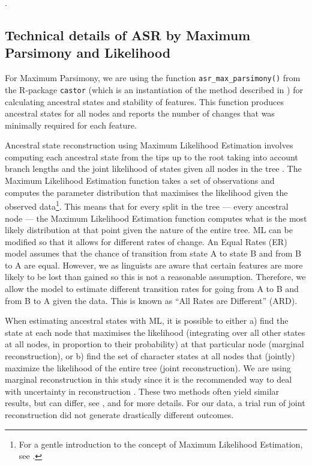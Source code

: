 \documentclass[12pt,letterpaper]{article}
\begin{document}
.

\FloatBarrier
\subsection{Technical details of ASR by Maximum Parsimony and Likelihood}
\label{supp:tech_details}

For Maximum Parsimony, we are using the function \texttt{asr\_max\_parsimony()} from the R-package \texttt{castor} \citep{louca2017efficient} (which is an instantiation of the method described in \citet{sankoff1975minimal}) for calculating ancestral states and stability of features. This function produces ancestral states for all nodes and reports the number of changes that was minimally required for each feature. 

Ancestral state reconstruction using Maximum Likelihood Estimation involves computing each ancestral state from the tips up to the root taking into account branch lengths and the joint likelihood of states given all nodes in the tree \citep{wilks1938large, fisher1912absolute, pagel1994detecting, cunningham1998reconstructing}. The Maximum Likelihood Estimation function takes a set of observations and computes the parameter distribution that maximises the likelihood given the observed data\footnote{For a gentle introduction to the concept of Maximum Likelihood Estimation, see \citet{jonny_ML}.}. This means that for every split in the tree --- every ancestral node --- the Maximum Likelihood Estimation function computes what is the most likely distribution at that point given the nature of the entire tree. ML can be modified so that it allows for different rates of change. An Equal Rates (ER) model assumes that the chance of transition from state A to state B and from B to A are equal. However, we as linguists are aware that certain features are more likely to be lost than gained so this is not a reasonable assumption. Therefore, we allow the model to estimate different transition rates for going from A to B and from B to A given the data. This is known as ``All Rates are Different'' (ARD).

When estimating ancestral states with ML, it is possible to either a) find the state at each node that maximises the likelihood (integrating over all other states at all nodes, in proportion to their probability) at that particular node (marginal reconstruction), or b) find the set of character states at all nodes that (jointly) maximize the likelihood of the entire tree (joint reconstruction). We are using marginal reconstruction in this study since it is the recommended way to deal with uncertainty in reconstruction \citep{revell_2014}. These two methods often yield similar results, but can differ, see \citet[259-260]{felsenstein2004inferring},  \citet[121-126]{yang2006computational} and \citet[5]{joy2016ancestral} for more details. For our data, a trial run of joint reconstruction did not generate drastically different outcomes.
\end{document}
